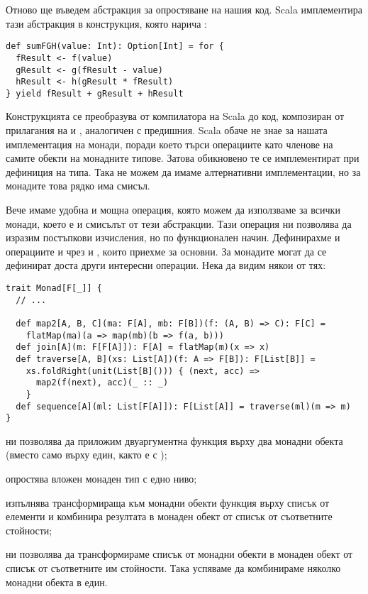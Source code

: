 Отново ще въведем абстракция за опростяване на нашия код. Scala имплементира тази абстракция в конструкция, която нарича :

\begin{lstlisting}
def sumFGH(value: Int): Option[Int] = for {
  fResult <- f(value)
  gResult <- g(fResult - value)
  hResult <- h(gResult * fResult)
} yield fResult + gResult + hResult
\end{lstlisting}

Конструкцията  се преобразува от компилатора на Scala до код, композиран от прилагания на  и , аналогичен с предишния. Scala обаче не знае за нашата имплементация на монади, поради което търси операциите като членове на самите обекти на монадните типове. Затова обикновено те се имплементират при дефиниция на типа. Така не можем да имаме алтернативни имплементации, но за монадите това рядко има смисъл.

Вече имаме удобна и мощна операция, която можем да използваме за всички монади, което е и смисълът от тези абстракции. Тази операция ни позволява да изразим постъпкови изчисления, но по функционален начин. Дефинирахме и операциите  и  чрез  и , които приехме за основни. За монадите могат да се дефинират доста други интересни операции. Нека да видим някои от тях:

\begin{lstlisting}
trait Monad[F[_]] {
  // ...
  
  def map2[A, B, C](ma: F[A], mb: F[B])(f: (A, B) => C): F[C] =
    flatMap(ma)(a => map(mb)(b => f(a, b)))
  def join[A](m: F[F[A]]): F[A] = flatMap(m)(x => x)
  def traverse[A, B](xs: List[A])(f: A => F[B]): F[List[B]] =
    xs.foldRight(unit(List[B]())) { (next, acc) =>
      map2(f(next), acc)(_ :: _)
    }
  def sequence[A](ml: List[F[A]]): F[List[A]] = traverse(ml)(m => m)
}
\end{lstlisting}

\begin{itemize*}
  \item {} ни позволява да приложим двуаргументна функция върху два монадни обекта (вместо само върху един, както е с );
  \item {} опростява вложен монаден тип с едно ниво;
  \item {} изпълнява трансформираща към монадни обекти функция върху списък от елементи и комбинира резултата в монаден обект от списък от съответните стойности;
  \item {} ни позволява да трансформираме списък от монадни обекти в монаден обект от списък от съответните им стойности. Така успяваме да комбинираме няколко монадни обекта в един.
\end{itemize*}

